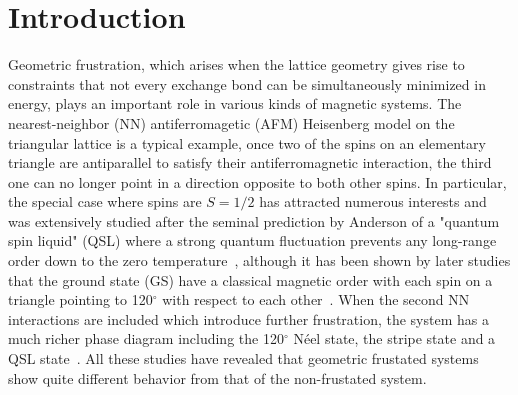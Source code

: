 \documentclass[aps,prb,reprint,amsfonts,amsmath,amssymb,showpacs,groupedaddress,superscriptaddress]{revtex4-1}
\begin{document}
\section{\label{sec:Introduction}Introduction}
Geometric frustration, which arises when the lattice geometry gives rise to constraints that not every exchange bond can be simultaneously minimized in energy, plays an important role in various kinds of magnetic systems. The nearest-neighbor (NN) antiferromagetic (AFM) Heisenberg model on the triangular lattice is a typical example, once two of the spins on an elementary triangle are antiparallel to satisfy their antiferromagnetic interaction, the third one can no longer point in a direction opposite to both other spins. In particular, the special case where spins are $S=1/2$ has attracted numerous interests and was extensively studied after the seminal prediction by Anderson of a "quantum spin liquid" (QSL) where a strong quantum fluctuation prevents any long-range order down to the zero temperature~\cite{Anderson1973}, although it has been shown by later studies that the ground state (GS) have a classical magnetic order with each spin on a triangle pointing to 120$^\circ$ with respect to each other~\cite{PhysRevLett.99.127004,PhysRevLett.82.3899,PhysRevB.50.10048,PhysRevLett.60.2531}. When the second NN interactions are included which introduce further frustration, the system has a much richer phase diagram including the 120$^\circ$ N\'{e}el state, the stripe state and a QSL state~\cite{PhysRevB.91.014426,PhysRevB.92.041105,PhysRevB.92.140403,PhysRevB.96.165141,PhysRevB.93.144411,JPSJ.83.093707,PhysRevB.96.075116,PhysRevB.94.121111,PhysRevLett.123.207203}. All these studies have revealed that geometric frustated systems show quite different behavior from that of the non-frustated system.
\end{document}
